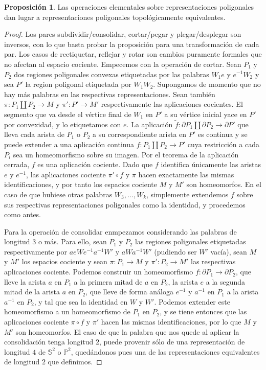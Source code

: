 \documentclass[10pt]{report}
\newcommand{\Esfera}{\mathbb{S}^2}
\newcommand{\Proyectivo}{\mathbb{P}^2}
\theoremstyle{definition}
\newtheorem{prop}[defin]{Proposición}
\begin{document}
\begin{prop}%
Las operaciones elementales sobre representaciones poligonales dan lugar a representaciones poligonales topológicamente equivalentes.
\end{prop}
\begin{proof}
Los pares subdividir/consolidar, cortar/pegar y plegar/desplegar son inversos, con lo que basta probar la proposición para una transformación de cada par. 
Los casos de reetiquetar, reflejar y rotar son cambios puramente formales que no afectan al espacio cociente. 
Empecemos con la operación de cortar. Sean $P_1$ y $P_2$ dos regiones poligonales convexas etiquetadas por las palabras $W_1e$ y $e^{-1}W_2$ y sea $P'$ la region poligonal etiquetada por $W_1 W_2$. Supongamos de momento que no hay más palabras en las respectivas representaciones. Sean también $\pi :P_1\amalg P_2\to M$ y $\pi' :P'\to M'$ respectivamente las aplicaciones cocientes. El segmento que va desde el vértice final de $W_1$ en $P'$ a su vértice inicial yace en $P'$ por convexidad, y lo etiquetamos con $e$. La aplicación $\tilde{f} :\partial P_1\amalg \partial P_2\to \partial P'$ que lleva cada arista de $P_1$ o $P_2$ a su correspondiente arista en $P'$ es continua y se puede extender a una aplicación continua $f:P_1\amalg P_2\to P'$ cuya restricción a cada $P_i$ sea un homeomorfismo sobre su imagen. Por el teorema de la aplicación cerrada, $f$ es una aplicación cociente. Dado que $f$ identifica únicamente las aristas $e$ y $e^{-1}$, las aplicaciones cociente $\pi '\circ f$ y $\pi$ hacen exactamente las mismas identificaciones, y por tanto los espacios cociente $M$ y $M'$ son homeomorfos. 
En el caso de que hubiese otras palabras $W_3,\dots ,W_k$, simplemente extendemos $f$ sobre sus respectivas representaciones poligonales como la identidad, y procedemos como antes.

Para la operación de consolidar enmpezamos considerando las palabras de longitud $3$ o más. Para ello, sean $P_1$ y $P_2$ las regiones poligonales etiquetadas respectivamente por $aeWe^{-1}a^{-1}W'$ y $aWa^{-1}W'$ (pudiendo ser $W'$ vacía), sean $M$ y $M'$ los espacios cociente y sean $\pi :P_1\to M$ y $\pi' :P_2\to M'$ las respectivas aplicaciones cociente. Podemos construir un homeomorfismo $f:\partial P_1\to \partial P_2$, que lleve la arista $a$ en $P_1$ a la primera mitad de $a$ en $P_2$, la arista $e$ a la segunda mitad de la arista $a$ en $P_2$, que lleve de forma análoga $e^{-1}$ y $a^{-1}$ en $P_1$ a la arista $a^{-1}$ en $P_2$, y tal que sea la identidad en $W$ y $W'$. Podemos extender este homeomorfismo a un homeomorfismo de $P_1$ en $P_2$, y se tiene entonces que las aplicaciones cociente $\pi \circ f$ y $\pi'$ hacen las mismas identificaciones, por lo que $M$ y $M'$ son homeomorfos. El caso de que la palabra que nos quede al aplicar la consolidación tenga longitud $2$, puede provenir sólo de una representación de longitud $4$ de $\Esfera$ o $\Proyectivo$, quedándonos pues una de las representaciones equivalentes de longitud $2$ que definimos.


\end{proof}
\end{document}
